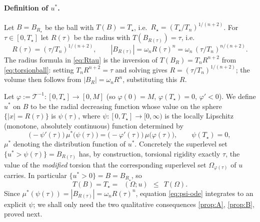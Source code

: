 \documentclass[11pt]{amsart}
\theoremstyle{definition}
\newcommand{\Om}{\Omega}
\newcommand{\abs}[1]{\left|#1\right|}
\DeclareMathOperator{\Tmod}{T_{\mathrm{mod}}}
\begin{document}
\paragraph{Definition of $u^*$.}
Let $B=B_{R_\star}$ be the ball with $T(B)=T_\star$, i.e.\
$R_\star=(T_\star/T_n)^{1/(n+2)}$. For $\tau\in[0,T_\star]$ let $R(\tau)$ be
the radius with $T(B_{R(\tau)})=\tau$, i.e.\
\begin{equation}\label{eq:Rtau}
  R(\tau)=(\tau/T_n)^{1/(n+2)},\qquad
  \abs{B_{R(\tau)}}=\omega_n R(\tau)^n
  =\omega_n\,(\tau/T_n)^{n/(n+2)}.
\end{equation}
The radius formula in \eqref{eq:Rtau} is the inversion of
$T(B_R)=T_n R^{n+2}$ from \eqref{eq:torsionball}: setting $T_n R^{n+2}=\tau$
and solving gives $R=(\tau/T_n)^{1/(n+2)}$; the volume then follows from
$\abs{B_R}=\omega_n R^n$, substituting this $R$.

Let $\varphi:=\mathcal T^{-1}:[0,T_\star]\to[0,M]$ (so $\varphi(0)=M$,
$\varphi(T_\star)=0$, $\varphi'<0$). We define $u^*$ on $B$ to be the radial
decreasing function whose value on the sphere $\{\abs x=R(\tau)\}$ is
$\psi(\tau)$, where $\psi:[0,T_\star]\to[0,\infty)$ is the
locally Lipschitz (monotone, absolutely continuous) function determined by
\begin{equation}\label{eq:psi-ode}
  \bigl(-\psi'(\tau)\bigr)\,\mu^*\!\bigl(\psi(\tau)\bigr)
  =\bigl(-\varphi'(\tau)\bigr)\,\mu\!\bigl(\varphi(\tau)\bigr),
  \qquad \psi(T_\star)=0,
\end{equation}
$\mu^*$ denoting the distribution function of $u^*$. Concretely the
superlevel set $\{u^*>\psi(\tau)\}=B_{R(\tau)}$ has, by construction,
torsional rigidity exactly $\tau$, the value of the \emph{modified}
torsion that the corresponding superlevel set $\Om_{\varphi(\tau)}$ of $u$
carries. In particular $\{u^*>0\}=B=B_{R_\star}$, so
\begin{equation}\label{eq:TB}
  T(B)=T_\star=\Tmod(\Om;u)\ \ \le\ \ T(\Om).
\end{equation}
Since $\mu^*(\psi(\tau))=\abs{B_{R(\tau)}}=\omega_n R(\tau)^n$, equation
\eqref{eq:psi-ode} integrates to an explicit $\psi$; we shall only need the
two qualitative consequences \ref{prop:A}, \ref{prop:B}, proved next.
\end{document}
